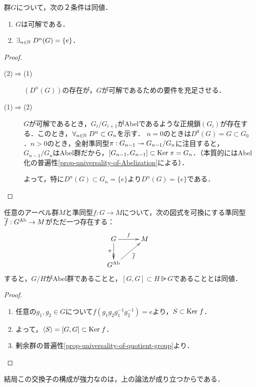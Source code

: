 \documentclass[uplatex,dvipdfmx]{jsreport}
\begin{document}
\begin{proposition}[可解群の導来列による特徴付け]\label{prop-characterization-of-solvableness}
    群$G$について，次の２条件は同値．
    \begin{enumerate}
        \item $G$は可解である．
        \item $\exists_{n\in\mathbb{N}}\;D^n(G)=\{e\}$．
    \end{enumerate}
\end{proposition}
\begin{proof}\mbox{}
    \begin{description}
        \item[(2)$\Rightarrow$(1)] $(D^n(G))$の存在が，$G$が可解であるための要件を充足させる．
        \item[(1)$\Rightarrow$(2)] $G$が可解であるとき，$G_i/G_{i+1}$がAbelであるような正規鎖$(G_i)$が存在する．このとき，$\forall_{n\in\mathbb{N}}\;D^{n}\subset G_{n}$を示す．
        $n=0$のときは$D^0(G)=G\subset G_0$．$n>0$のとき，全射準同型$\pi:G_{n-1}\twoheadrightarrow G_{n-1}/G_n$に注目すると，$G_{n-1}/G_n$はAbel群だから，$[G_{n-1},G_{n-1}]\subset\mathrm{Ker}\;\pi=G_n$．（本質的にはAbel化の普遍性\ref{prop-universality-of-Abelization}による）．

        よって，特に$D^n(G)\subset G_n=\{e\}$より$D^n(G)=\{e\}$である．
    \end{description}
\end{proof}

\begin{proposition}[Abel化の普遍性]\label{prop-universality-of-Abelization}
    任意のアーベル群$M$と準同型$f:G\to M$について，次の図式を可換にする準同型$\overline{f}:G^{\mathrm{Ab}}\to M$がただ一つ存在する：
    \[\xymatrix{
        G\ar[r]^-f\ar@{->>}[d]_-\pi&M\\
        G^\Ab\ar[ur]_-{\o{f}}
    }\]
    すると，$G/H$がAbel群であることと，$[G,G]\subset H\rsub G$であることとは同値．
\end{proposition}
\begin{proof}\mbox{}
    \begin{enumerate}
        \item 任意の$g_1,g_2\in G$について$f(g_1g_2g_1^{-1}g_2^{-1})=e$より，$S\subset\mathrm{Ker}\; f$．
        \item よって，$\langle S\rangle=[G,G]\subset\mathrm{Ker}\; f$．
        \item 剰余群の普遍性\ref{prop-universality-of-quotient-group}より．
    \end{enumerate}
\end{proof}
\begin{remarks}
    結局この交換子の構成が強力なのは，上の論法が成り立つからである．
\end{remarks}
\end{document}
